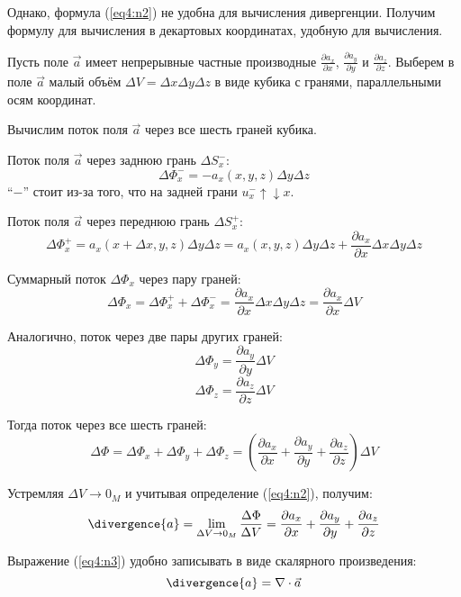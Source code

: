 	Однако, формула (\ref{eq4:n2}) не удобна для вычисления дивергенции.
	Получим формулу для вычисления в декартовых координатах, удобную для вычисления.
	
	Пусть поле \( \vec{a} \) имеет непрерывные частные производные \( \frac{\partial a_x}{\partial x} \), \( \frac{\partial a_y}{\partial y} \) и \( \frac{\partial a_z}{\partial z} \). Выберем в поле \( \vec{a} \) малый объём \( \Delta V = \Delta x\Delta y\Delta z\) в виде кубика с гранями, параллельными осям координат.
	
	
	Вычислим поток поля \( \vec{a} \) через все шесть граней кубика.
	
	Поток поля \( \vec{a} \) через заднюю грань \( \Delta S_x^{-} \):
	\[ \Delta\Phi_x^{-} = -a_x(x, y, z)\Delta y\Delta z \]
	“\( -\)” стоит из-за того, что на задней грани \( u_x^{-} \uparrow\downarrow x \).
	
	Поток поля \( \vec{a} \) через переднюю грань \( \Delta S_x^{+} \):
	\[ \Delta\Phi_x^{+} = a_x(x + \Delta x, y, z)\Delta y\Delta z = a_x(x, y, z)\Delta y\Delta z + \frac{\partial a_x}{\partial x}\Delta x\Delta y\Delta z \]
	
	Суммарный поток \( \Delta\Phi_x \) через пару граней:
	\[ \Delta\Phi_x = \Delta\Phi_x^{+} + \Delta\Phi_x^{-} = \frac{\partial a_x}{\partial x}\Delta x\Delta y\Delta z = \frac{\partial a_x}{\partial x}\Delta V \]
	
	Аналогично, поток через две пары других граней:
	\[ \Delta\Phi_y = \frac{\partial a_y}{\partial y}\Delta V \]
	\[ \Delta\Phi_z = \frac{\partial a_z}{\partial z}\Delta V \]
	
	Тогда поток через все шесть граней:
	\[ \Delta\Phi = \Delta\Phi_x + \Delta\Phi_y + \Delta\Phi_z = \left(\frac{\partial a_x}{\partial x} + \frac{\partial a_y}{\partial y} + \frac{\partial a_z}{\partial z}\right)\Delta V \]
	
	Устремляя \( \Delta V \to 0_M \) и учитывая определение (\ref{eq4:n2}), получим:
	\begin{equation}
		\divergence{a} = \lim_{\Delta V \to 0_M} \frac{\Delta\Phi}{\Delta V} = \frac{\partial a_x}{\partial x} + \frac{\partial a_y}{\partial y} + \frac{\partial a_z}{\partial z} \label{eq4:n3}
	\end{equation}
	
	Выражение (\ref{eq4:n3}) удобно записывать в виде скалярного произведения:
	\begin{equation}
		\divergence{a} = \nabla\cdot\vec{a} \label{eq4:n4}
	\end{equation}
	
